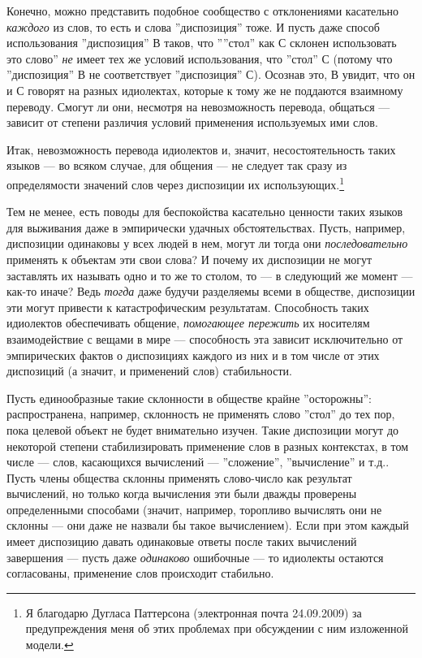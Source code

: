 \documentclass[11pt]{book}
\begin{document}
Конечно, можно представить подобное сообщество с отклонениями касательно \textit{каждого} из слов, то есть и слова ''диспозиция'' тоже. И пусть даже способ использования ''диспозиция'' В таков, что ''''стол'' как С склонен использовать это слово'' \textit{не} имеет тех же условий использования, что ''стол'' С (потому что ''диспозиция'' В не соответствует ''диспозиция'' С). Осознав это, В увидит, что он и С говорят на разных идиолектах, которые к тому же не поддаются взаимному переводу. Смогут ли они, несмотря на невозможность перевода, общаться --- зависит от степени различия условий применения используемых ими слов.

Итак, невозможность перевода идиолектов и, значит, несостоятельность таких языков --- во всяком случае, для общения --- не следует так сразу из определямости значений слов через диспозиции их использующих.\footnote{Я благодарю Дугласа Паттерсона (электронная почта 24.09.2009) за предупреждения меня об этих проблемах при обсуждении с ним изложенной модели.}

Тем не менее, есть поводы для беспокойства касательно ценности таких языков для выживания даже в эмпирически удачных обстоятельствах. Пусть, например, диспозиции одинаковы у всех людей в нем, могут ли тогда они \textit{последовательно} применять к объектам эти свои слова? И почему их диспозиции не могут заставлять их называть одно и то же то столом, то --- в следующий же момент --- как-то иначе? Ведь \textit{тогда} даже будучи разделяемы всеми в обществе, диспозиции эти могут привести к катастрофическим результатам. Способность таких идиолектов обеспечивать общение, \textit{помогающее пережить} их носителям взаимодействие с вещами в мире --- способность эта зависит исключительно от эмпирических фактов о диспозициях каждого из них и в том числе от этих диспозиций (а значит, и применений слов) стабильности.

Пусть единообразные такие склонности в обществе крайне ''осторожны'': распространена, например, склонность не применять слово ''стол'' до тех пор, пока целевой объект не будет внимательно изучен. Такие диспозиции могут до некоторой степени стабилизировать применение слов в разных контекстах, в том числе --- слов, касающихся вычислений --- ''сложение'', ''вычисление'' и т.д.. Пусть члены общества склонны применять слово-число как результат вычислений, но только когда вычисления эти были дважды проверены определенными способами (значит, например, торопливо вычислять они не склонны --- они даже не назвали бы такое вычислением). Если при этом каждый имеет диспозицию давать одинаковые ответы после таких вычислений завершения --- пусть даже \textit{одинаково} ошибочные --- то идиолекты остаются согласованы, применение слов происходит стабильно.
\end{document}
